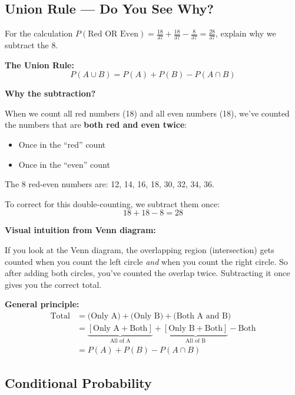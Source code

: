 \documentclass[11pt,a4paper]{article}
\begin{document}
\subsection*{Union Rule — Do You See Why?}

\begin{question}
For the calculation $P(\text{Red OR Even}) = \frac{18}{37} + \frac{18}{37} - \frac{8}{37} = \frac{28}{37}$, explain why we subtract the 8.
\end{question}

\begin{answer}
\textbf{The Union Rule:}
\[
P(A \cup B) = P(A) + P(B) - P(A \cap B)
\]

\textbf{Why the subtraction?}

When we count all red numbers (18) and all even numbers (18), we've counted the numbers that are \textbf{both red and even twice}:
\begin{itemize}
    \item Once in the ``red'' count
    \item Once in the ``even'' count
\end{itemize}

The 8 red-even numbers are: 12, 14, 16, 18, 30, 32, 34, 36.

To correct for this double-counting, we subtract them once:
\[
18 + 18 - 8 = 28
\]

\textbf{Visual intuition from Venn diagram:}

If you look at the Venn diagram, the overlapping region (intersection) gets counted when you count the left circle \textit{and} when you count the right circle. So after adding both circles, you've counted the overlap twice. Subtracting it once gives you the correct total.

\textbf{General principle:}
\begin{align*}
\text{Total} &= \text{(Only A)} + \text{(Only B)} + \text{(Both A and B)}\\
&= \underbrace{[\text{Only A} + \text{Both}]}_{\text{All of A}} + \underbrace{[\text{Only B} + \text{Both}]}_{\text{All of B}} - \text{Both}\\
&= P(A) + P(B) - P(A \cap B)
\end{align*}
\end{answer}

\subsection*{Conditional Probability}
\end{document}
